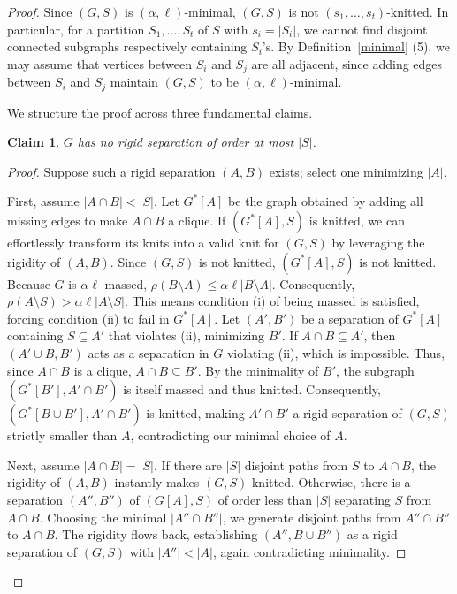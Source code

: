 \documentclass[11pt]{amsart}
\newtheorem{claim}{Claim}
\begin{document}
\begin{proof}
Since $(G,S)$ is $(\alpha, \ell)$-minimal, $(G,S)$ is not $(s_1, \ldots, s_t)$-knitted. In particular, for a partition $S_1,\ldots, S_t$ of $S$ with $s_i=|S_i|$, we cannot find disjoint connected subgraphs respectively containing $S_i$'s.  By Definition~\ref{minimal} (5), we may assume that vertices between $S_i$ and $S_j$ are all adjacent, since adding edges between $S_i$ and $S_j$ maintain $(G,S)$ to be $(\alpha, \ell)$-minimal.  



We structure the proof across three fundamental claims.

\begin{claim}\label{rigid-lemma}
$G$ has no rigid separation of order at most $|S|$.
\end{claim}

\begin{proof} 
Suppose such a rigid separation $(A,B)$ exists; select one minimizing $|A|$.  

First, assume $|A\cap B| < |S|$. Let $G^*[A]$ be the graph obtained by adding all missing edges to make $A\cap B$ a clique. If $(G^*[A], S)$ is knitted, we can effortlessly transform its knits into a valid knit for $(G,S)$ by leveraging the rigidity of $(A,B)$. Since $(G,S)$ is not knitted, $(G^*[A], S)$ is not knitted.
Because $G$ is $\alpha \ell$-massed, $\rho(B\setminus A) \le \alpha \ell|B\setminus A|$. Consequently, $\rho(A\setminus S) > \alpha \ell|A\setminus S|$. This means condition (i) of being massed is satisfied, forcing condition (ii) to fail in $G^*[A]$.
Let $(A', B')$ be a separation of $G^*[A]$ containing $S \subseteq A'$ that violates (ii), minimizing $B'$. If $A\cap B \subseteq A'$, then $(A'\cup B, B')$ acts as a separation in $G$ violating (ii), which is impossible. Thus, since $A\cap B$ is a clique, $A\cap B \subseteq B'$. 
By the minimality of $B'$, the subgraph $(G^*[B'], A'\cap B')$ is itself massed and thus knitted. Consequently, $(G^*[B\cup B'], A'\cap B')$ is knitted, making $A'\cap B'$ a rigid separation of $(G,S)$ strictly smaller than $A$, contradicting our minimal choice of $A$.

Next, assume $|A\cap B| = |S|$. If there are $|S|$ disjoint paths from $S$ to $A\cap B$, the rigidity of $(A,B)$ instantly makes $(G,S)$ knitted. Otherwise, there is a separation $(A'', B'')$ of $(G[A], S)$ of order less than $|S|$ separating $S$ from $A\cap B$. Choosing the minimal $|A''\cap B''|$, we generate disjoint paths from $A''\cap B''$ to $A\cap B$. The rigidity flows back, establishing $(A'', B\cup B'')$ as a rigid separation of $(G,S)$ with $|A''| < |A|$, again contradicting minimality.
\end{proof}


\end{proof}
\end{document}
